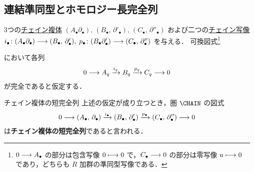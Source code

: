 \documentclass[algtopo_main]{subfiles}
\begin{document}
\subsection{連結準同型とホモロジー長完全列}

3つの\hyperref[def:CC]{チェイン複体} $(A_\bullet \partial_\bullet),\, (B_\bullet,\, \partial'_\bullet),\, (C_\bullet,\, \partial''_\bullet)$
および二つの\hyperref[def:chainmap]{チェイン写像} $i_\bullet \colon (A_\bullet \partial_\bullet) \longrightarrow (B_\bullet,\, \partial'_\bullet),\; p_\bullet \colon (B_\bullet \partial'_\bullet) \longrightarrow (C_\bullet,\, \partial''_\bullet)$ を与える．
可換図式\footnote{$0 \longrightarrow A_\bullet$ の部分は包含写像 $0 \longmapsto 0$ で，$C_\bullet \longrightarrow 0$ の部分は零写像 $u \longmapsto 0$ であり，どちらも $R$ 加群の準同型写像である．}
\begin{figure}[H]
    \centering
    \caption{}
    \label{fig:cnct1}
\end{figure}
において各列
\begin{align}
    \label{eq:ES1}
    0 \longrightarrow A_q \xrightarrow{i_q} B_q \xrightarrow{p_q} C_q \longrightarrow 0
\end{align}
が完全であると仮定する．

\begin{mydef}[label=def:chain-exact]{チェイン複体の短完全列}
    上述の仮定が成り立つとき，圏 $\CHAIN$ の図式
    \begin{align}
        0 \longrightarrow (A_\bullet,\, \partial_\bullet) \xrightarrow{i_\bullet} (B_\bullet,\, \partial'_\bullet) \xrightarrow{p_\bullet} (C_\bullet,\, \partial''_\bullet) \longrightarrow 0
    \end{align}
    は\textbf{チェイン複体の短完全列}であると言われる．
\end{mydef}
\end{document}
